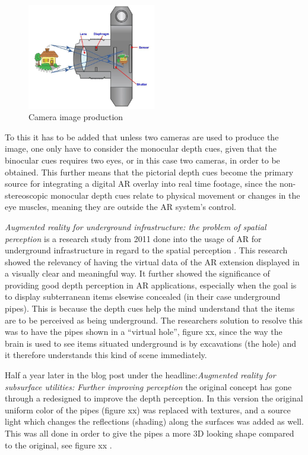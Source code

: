 \begin{figure}[h!]
   \centering
   \includegraphics[width=0.5\textwidth]{figures/camera.jpg}
   \caption{Camera image production \cite{Camera}}\label{fig:camera}
\end{figure}

To this it has to be added that unless two cameras are used to produce the image, one only have to consider the monocular depth cues, given that the binocular cues requires two eyes, or in this case two cameras, in order to be obtained. This further means that the pictorial depth cues become the primary source for integrating a digital AR overlay into real time footage, since the non-stereoscopic monocular depth cues relate to physical movement or changes in the eye muscles, meaning they are outside the AR system’s control.

\textit{Augmented reality for underground infrastructure: the problem of spatial perception} is a research study from 2011 done into the usage of AR for underground infrastructure in regard to the spatial perception . This research showed the relevancy of having the virtual data of the AR extension displayed in a visually clear and meaningful way. It further showed the significance of providing good depth perception in AR applications, especially when the goal is to display subterranean items elsewise concealed (in their case underground pipes). This is because the depth cues help the mind understand that the items are to be perceived as being underground. The researchers solution to resolve this was to have the pipes shown in a “virtual hole”, figure xx, since the way the brain is used to see items situated underground is by excavations (the hole) and it therefore understands this kind of scene immediately.


Half a year later in the blog post under the headline:\textit{Augmented reality for subsurface utilities: Further improving perception} the original concept has gone through a redesigned to improve the depth perception. In this version the original uniform color of the pipes (figure xx) was replaced with textures, and a source light which changes the reflections (shading) along the surfaces was added as well. This was all done in order to give the pipes a more 3D looking shape compared to the original, see figure xx .
